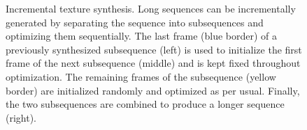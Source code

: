 \begin{figure}[t]
	\centering
	\caption[Incremental texture synthesis.]{Incremental texture synthesis.
	Long sequences can be incrementally generated by
separating the sequence into subsequences and optimizing them 
sequentially. The last frame (blue border) of a previously synthesized subsequence
(left) is used to initialize the first frame of the next subsequence (middle)
and is kept fixed throughout optimization. The remaining frames of the 
subsequence (yellow border) are initialized randomly and optimized as per usual.
Finally, the two subsequences are combined to produce a longer
sequence (right).}
	\label{fig:incremental_synthesis}
\end{figure}

